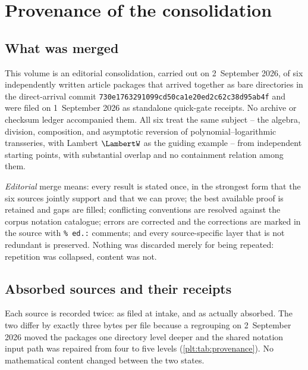 \documentclass[11pt,oneside]{article}
\theoremstyle{plain}
\theoremstyle{definition}
\theoremstyle{remark}
\begin{document}
\section{Provenance of the consolidation}
\label{plt:sec:provenance}

\subsection{What was merged}

This volume is an editorial consolidation, carried out on 2~September 2026, of
six independently written article packages that arrived together as bare
directories in the direct-arrival commit
\texttt{730e1763291099cd\allowbreak 50ca1e20ed2c62c3\allowbreak 8d95ab4f} and were filed on
1~September 2026 as standalone quick-gate receipts.  No archive or checksum
ledger accompanied them.  All six treat the same subject -- the algebra,
division, composition, and asymptotic reversion of polynomial--logarithmic
transseries, with Lambert \(\LambertW\) as the guiding example -- from
independent starting points, with substantial overlap and no containment
relation among them.

\emph{Editorial} merge means: every result is stated once, in the strongest
form that the six sources jointly support and that we can prove; the best
available proof is retained and gaps are filled; conflicting conventions are
resolved against the corpus notation catalogue; errors are corrected and the
corrections are marked in the source with \verb|% ed.:| comments; and every
source-specific layer that is not redundant is preserved.  Nothing was
discarded merely for being repeated: repetition was collapsed, content was not.

\subsection{Absorbed sources and their receipts}

Each source is recorded twice: as filed at intake, and as actually absorbed.
The two differ by exactly three bytes per file because a regrouping on
2~September 2026 moved the packages one directory level deeper and the shared
notation input path was repaired from four to five levels
(\cref{plt:tab:provenance}).  No mathematical content changed between the two
states.
\end{document}
